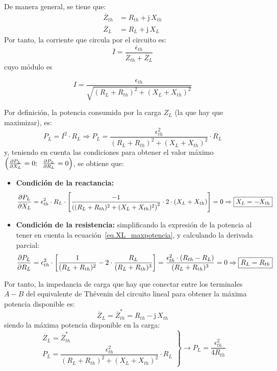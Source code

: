 De manera general, se tiene que:
\begin{align*}
  \overline{Z}_{th} &= R_{th} + \mathrm{j}\,X_{th}\\
  \overline{Z}_L &= R_L + \mathrm{j}\,X_L
\end{align*}
Por tanto, la corriente que circula por el circuito es:
\begin{equation*}
  \overline{I} = \frac{\overline{\epsilon}_{th}}{\overline{Z}_{th} + \overline{Z}_L}
\end{equation*}
cuyo módulo es

\begin{equation*}
  I=\frac{\epsilon_{th}}{\sqrt{(R_L+R_{th})^2+(X_L+X_{th})^2}}
\end{equation*}

Por definición, la potencia consumida por la carga $Z_L$ (la que hay que
maximizar), es:
\begin{equation*}
  P_L= I^2 \cdot R_L\Rightarrow P_L = \dfrac{\epsilon_{th}^2}{{(R_L+R_{th})^2+(X_L+X_{th})^2}} \cdot R_L
\end{equation*}
y, teniendo en cuenta las condiciones para obtener el valor máximo
$\left(\diffp{P_L}{X_L} = 0;\;\; \diffp{P_L}{R_L} = 0\right)$, se
obtiene que:
\begin{itemize}
\item \textbf{Condición de la reactancia:}
  \begin{equation}\label{eq.XL_maxpotencia}
    \diffp{P_L}{X_L} = \epsilon^2_{th} \cdot R_L \cdot \left[\frac{-1}{\left((R_L + R_{th})^2 + (X_L + X_{th})^2\right)^2} \cdot 2 \cdot (X_L + X_{th})\right]=0\Rightarrow \boxed{X_L = - X_{th}}
  \end{equation}
\item \textbf{Condición de la resistencia:} simplificando la expresión
  de la potencia al tener en cuenta la
  ecuación~\eqref{eq.XL_maxpotencia}, y calculando la derivada
  parcial:
  \begin{equation}\label{eq.R_maxpotencia}
    \diffp{P_L}{R_L} = \epsilon^2_{th} \cdot \left[\frac{1}{(R_L + R_{th})^2} - 2 \cdot \frac{R_L}{(R_L + R_{th})^3}\right]= \frac{\epsilon^2_{th} \cdot (R_{th} - R_L)}{(R_L + R_{th})^3}=0\Rightarrow \boxed{R_L = R_{th}}
  \end{equation}
\end{itemize}
Por tanto, la impedancia de carga que hay que conectar entre los
terminales $A-B$ del equivalente de Thévenin del circuito lineal para
obtener la máxima potencia disponible es:
\begin{equation}
  \boxed{\overline{Z}_L = \overline{Z}_{th}^*=R_{th}-\mathrm{j}\,X_{th}}
\end{equation}
siendo la máxima potencia disponible en la carga:
\begin{equation}
  \left.
    \begin{matrix}
      \overline{Z}_L = \overline{Z}_{th}^*\\
      P_L = \dfrac{\epsilon_{th}^2}{{(R_L+R_{th})^2+(X_L+X_{th})^2}} \cdot R_L
    \end{matrix} \right\}\rightarrow
  \boxed{P_L = \frac{\epsilon^2_{th}}{4 R_{th}}}
\end{equation}

